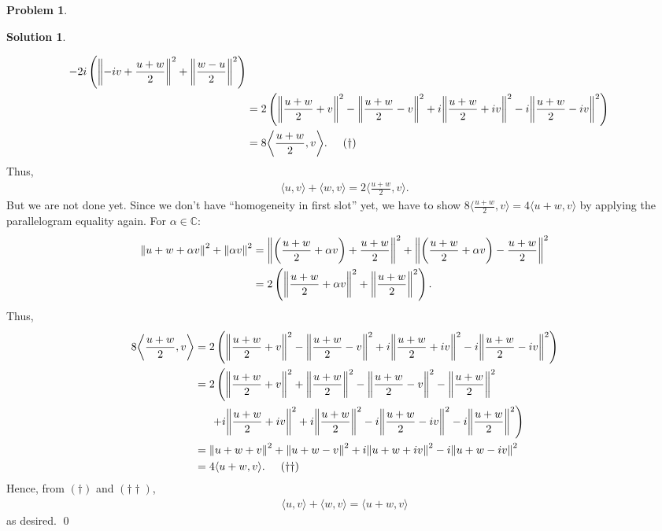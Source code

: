 \documentclass{article}
\theoremstyle{definition}
\newtheorem*{prob*}{Problem}
\newtheorem*{sln*}{Solution}
\newcommand{\la}{\langle}
\newcommand{\ra}{\rangle}
\begin{document}
\begin{prob*}
\begin{enumerate}
\begin{sln*}
\begin{enumerate}
\begin{align*}
				- 2i\left( \norm{ -iv + \frac{u + w}{2}}^2 + \norm{\frac{w - u}{2}}^2 \right)\\
				&= 2\left( \norm{ \frac{u + w}{2}+ v}^2 - \norm{\frac{u + w}{2} -v}^2 + i\norm{\frac{u+w}{2}+iv}^2 - i\norm{\frac{u+w}{2}-iv}^2 \right)\\
				&= 8 \bigg\langle \frac{u+w}{2}, v \bigg\rangle. \hspace{0.5cm} (\dagger)
				\end{align*}
				Thus, 
				\begin{align*}
				\la u,v \ra + \la w, v \ra = 2\bigg\la \frac{u+w}{2} ,v \bigg\ra.
				\end{align*}
				But we are not done yet. Since we don't have ``homogeneity in first slot'' yet, we have to show $8 \bigg\langle \frac{u+w}{2}, v \bigg\rangle =4 \la u+ w, v \ra$ by applying the parallelogram equality again. For $\alpha \in \mathbb{C}$:
				\begin{align*}
				\norm{u + w + \alpha v}^2 + \norm{\alpha v}^2 &= \norm{\left(\frac{u+w}{2} + \alpha v \right)+ \frac{u+w}{2}}^2 + \norm{\left(\frac{u+w}{2} + \alpha v\right) - \frac{u+w}{2}}^2\\
				&= 2\left(  \norm{\frac{u+w}{2} + \alpha v}^2 + \norm{\frac{u+w}{2}}^2  \right).
				\end{align*} 
				Thus,
				\begin{align*}
				8 \bigg\langle \frac{u+w}{2}, v \bigg\rangle &= 2\left( \norm{ \frac{u + w}{2}+ v}^2 - \norm{\frac{u + w}{2} -v}^2 + i\norm{\frac{u+w}{2}+iv}^2 - i\norm{\frac{u+w}{2}-iv}^2 \right)\\
				&= 2\left( \norm{ \frac{u + w}{2}+ v}^2 + \norm{\frac{u+w}{2}}^2 - \norm{\frac{u + w}{2} -v}^2 - \norm{\frac{u+w}{2}}^2 \right.\\
				&\left.\hspace{0.5cm}+ i\norm{\frac{u+w}{2}+iv}^2 + i \norm{\frac{u+w}{2}}^2 - i\norm{\frac{u+w}{2}-iv}^2-i \norm{\frac{u+w}{2}}^2 \right)\\
				&= \norm{u+w + v}^2 + \norm{u+w-v}^2 + i \norm{u+w+iv}^2 - i\norm{u+w-iv}^2 \\
				&= 4\la u+w, v \ra. 	\hspace{0.5cm} (\dagger\dagger)
				\end{align*}
				Hence, from $(\dagger)$ and $(\dagger\dagger)$,
				\begin{align*}
				\la u,v \ra + \la w,v \ra = \la u+w,v \ra
				\end{align*}
				as desired. \qed
				

\end{enumerate}
\end{sln*}
\end{enumerate}
\end{prob*}
\end{document}
